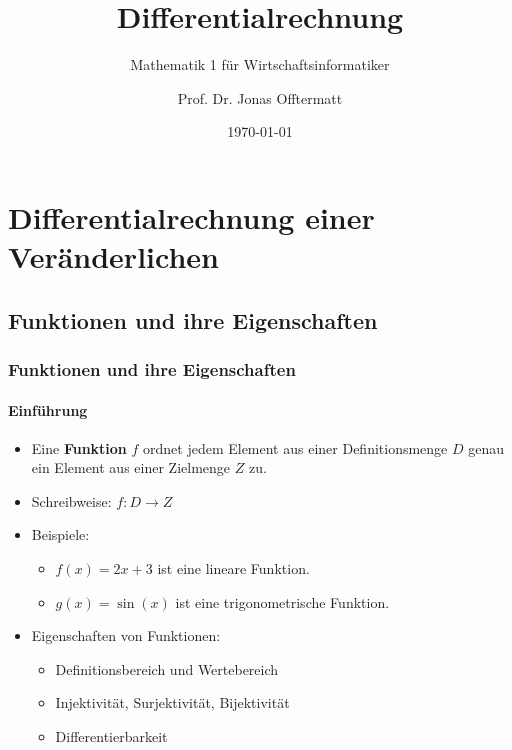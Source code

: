 \documentclass{beamer}
\title{Differentialrechnung}
\subtitle{Mathematik 1 für Wirtschaftsinformatiker}
\author{Prof. Dr. Jonas Offtermatt}
\date{\today}
\begin{document}
\section{Differentialrechnung einer Veränderlichen}
\subsection{Funktionen und ihre Eigenschaften}

\begin{frame}
  \frametitle{Funktionen und ihre Eigenschaften}
  \framesubtitle{Einführung}

  \begin{itemize}
    \item Eine \textbf{Funktion} $f$ ordnet jedem Element aus einer Definitionsmenge $D$ genau ein Element aus einer Zielmenge $Z$ zu.
    \item Schreibweise: $f: D \to Z$
    \item Beispiele:
      \begin{itemize}
        \item $f(x) = 2x + 3$ ist eine lineare Funktion.
        \item $g(x) = \sin(x)$ ist eine trigonometrische Funktion.
      \end{itemize}
    \item Eigenschaften von Funktionen:
      \begin{itemize}
        \item Definitionsbereich und Wertebereich
        \item Injektivität, Surjektivität, Bijektivität
        \item Differentierbarkeit
      \end{itemize}
  \end{itemize}
\end{frame}
\end{document}
